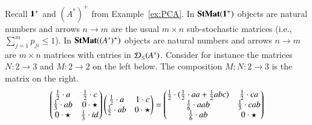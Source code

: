 \begin{example}\label{ex:matrices}
Recall $\mathbf{1}^+$ and $(A^*)^+$ from Example~\ref{ex:PCA}.
In $\mathbf{StMat}(\mathbf{1}^+)$ objects are natural numbers and arrows $n \to m$ are the usual $m\times n$ sub-stochastic matrices (i.e., $\sum_{j=1}^mp_{ji}\leq 1$).
%
In $\mathbf{StMat}((A^*)^+)$ objects are natural numbers and arrows $n \to m$ are $m\times n$ matrices with entries in $\mathcal{D}_{\leq}(A^*)$. Consider for instance the matrices $N\colon 2\to 3$ and $M\colon 2 \to 2$ on the left below.  The composition $M;N\colon 2 \to 3$ is the matrix on the right.
\begin{equation*}
\begin{pmatrix}
    \frac{1}{2} \cdot a & \frac{1}{2} \cdot c\\
    \frac{1}{3} \cdot ab & 0 \cdot \star \\
    0 \cdot \star & \frac{1}{3} \cdot {id}_{}
\end{pmatrix} 
\begin{pmatrix}
    \frac{1}{2} \cdot a & 1 \cdot c\\
    \frac{1}{2} \cdot ab & 0 \cdot \star \\
\end{pmatrix} 
=
\begin{pmatrix}
    \frac{1}{2} \cdot (\frac{1}{2} \cdot aa +\frac{1}{2}abc) & \frac{1}{2} \cdot ca\\
    \frac{1}{6} \cdot aab & \frac{1}{3} \cdot cab \\
    \frac{1}{6} \cdot ab  & 0 \cdot \star
\end{pmatrix} 
\end{equation*}
\end{example}


